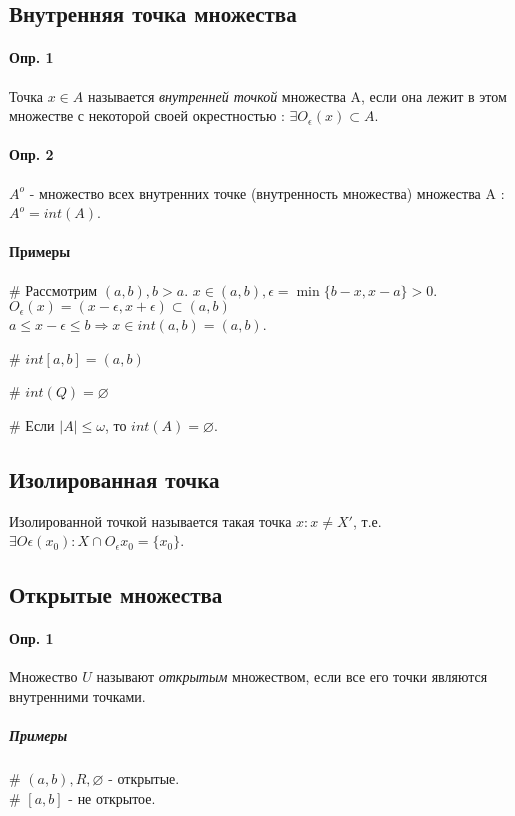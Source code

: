 \documentclass[10pt]{article}
\begin{document}
		\subsection{Внутренняя точка множества}
			\paragraph{Опр. 1} \label{int_t1} Точка $x \in A$ называется \textit{внутренней точкой} множества A, если она лежит в этом множестве с некоторой своей окрестностью : $\exists O_\epsilon(x) \subset A$.
			\paragraph{Опр. 2} \label{setint_t1} $A^o$ - множество всех внутренних точке (внутренность множества) множества A : $A^o = int (A)$.
			
			\paragraph{Примеры}
			\# Рассмотрим $(a, b), b > a$. $x \in (a, b), \epsilon = \min\{b-x, x-a\} > 0$. \\
			$O_\epsilon(x) = (x-\epsilon, x+\epsilon) \subset (a,b)$\\
			$a \le x - \epsilon \le b \Rightarrow x \in int(a,b) = (a,b)$.
			
			\# $int[a,b] = (a,b)$
			
			\# $int(Q) = \varnothing$
			
			\# Если $|A| \le \omega$, то $int(A) = \varnothing$.
		\subsection{Изолированная точка}
			Изолированной точкой называется такая точка $x : x \neq X'$, т.е. $\exists O\epsilon(x_0) : X \cap O_\epsilon{x_0} = \{x_0\}$.
		\subsection{Открытые множества}
			\paragraph{Опр. 1} \label{openset1} Множество $U$ называют \textit{открытым} множеством, если все его точки являются внутренними точками.
			
			\subparagraph{Примеры}
			\# $(a,b), R, \varnothing$ - открытые.\\
			\# $[a,b]$ - не открытое.
			
\end{document}
